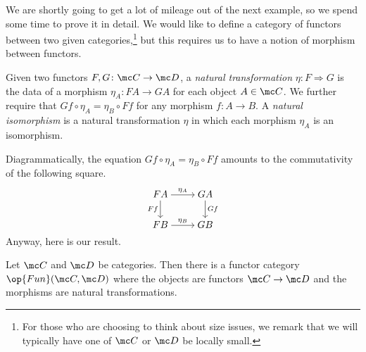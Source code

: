 \documentclass[../notes.tex]{subfiles}
\begin{document}
We are shortly going to get a lot of mileage out of the next example, so we spend some time to prove it in detail. We would like to define a category of functors between two given categories,\footnote{For those who are choosing to think about size issues, we remark that we will typically have one of $\mc C$ or $\mc D$ be locally small.} but this requires us to have a notion of morphism between functors.
\begin{definition}
	Given two functors $F,G\colon\mc C\to\mc D$, a \textit{natural transformation} $\eta\colon F\Rightarrow G$ is the data of a morphism $\eta_A\colon FA\to GA$ for each object $A\in\mc C$. We further require that $Gf\circ\eta_A=\eta_{B}\circ Ff$ for any morphism $f\colon A\to B$. A \textit{natural isomorphism} is a natural transformation $\eta$ in which each morphism $\eta_A$ is an isomorphism.
\end{definition}
Diagrammatically, the equation $Gf\circ\eta_A=\eta_{B}\circ Ff$ amounts to the commutativity of the following square.
\[\begin{tikzcd}[cramped]
	FA & GA \\
	FB & GB
	\arrow["{\eta_A}", from=1-1, to=1-2]
	\arrow["Ff"', from=1-1, to=2-1]
	\arrow["Gf", from=1-2, to=2-2]
	\arrow["{\eta_B}", from=2-1, to=2-2]
\end{tikzcd}\]
Anyway, here is our result.
\begin{lemma} \label{lem:functor-cat}
	Let $\mc C$ and $\mc D$ be categories. Then there is a functor category $\op{Fun}(\mc C,\mc D)$ where the objects are functors $\mc C\to\mc D$ and the morphisms are natural transformations.
\end{lemma}
\end{document}
